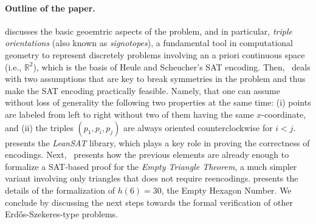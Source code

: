 \paragraph{Outline of the paper.}  discusses the basic geoemtric aspects of the problem, and in particular, \emph{triple orientations} (also known as \emph{signotopes}), a fundamental tool in computational geometry to represent discretely problems involving an a priori continuous space (i.e., $\mathbb{R}^2$), which is the basis of Heule and Scheucher's SAT encoding. Then,~ deals with two assumptions that are key to break symmetries in the problem and thus make the SAT encoding practically feasible. Namely, that one can assume without loss of generality the following two properties at the same time: (i) points are labeled from left to right without two of them having the same $x$-coordinate, and (ii) the triples $(p_1, p_i, p_j)$ are always oriented counterclockwise for $i < j$. 
 presents the \emph{LeanSAT} library, which plays a key role in proving the correctness of encodings. Next,~ presents how the previous elements are already enough to formalize a SAT-based proof for the \emph{Empty Triangle Theorem}, a much simpler variant involving only triangles that does not require reencodings.  presents the details of the formalization of $h(6) = 30$, the Empty Hexagon Number. We conclude by discussing the next steps towards the formal verification of other Erd\H{o}s-Szekeres-type problems.
